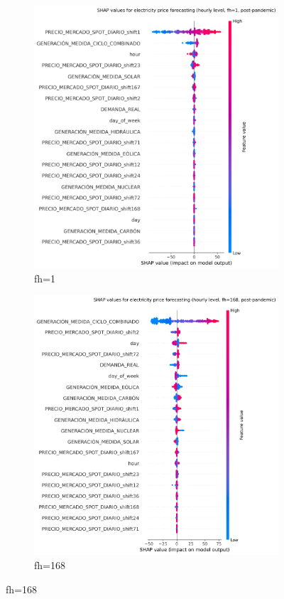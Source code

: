 \begin{figure}[H]
\centering
    \begin{subfigure}{.45\textwidth}
        \centering
        \includegraphics[width=1\linewidth]{images/analysis/shap-hourly-post-1}
        \caption{fh=1}
    \end{subfigure}
    \begin{subfigure}{.45\textwidth}
        \centering
        \includegraphics[width=1\linewidth]{images/analysis/shap-hourly-post-168}
        \caption{fh=168}
    \end{subfigure}


\end{figure}

